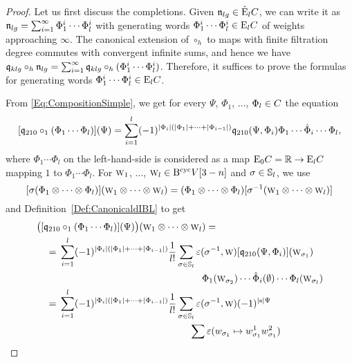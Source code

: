 \documentclass[\MainFolder/Text.tex]{subfiles}
\begin{document}
\begin{proof}
Let us first discuss the completions. Given $\mathfrak{n}_{lg}\in \hat{\mathrm{E}}_l C$, we can write it as $\mathfrak{n}_{lg} = \sum_{i=1}^\infty \Phi_1^i \dotsb \Phi_l^i$ with generating words $\Phi_1^i\dotsb \Phi_l^i\in \mathrm{E}_l C$ of weights approaching $\infty$. The canonical extension of $\circ_h$ to maps with finite filtration degree commutes with convergent infinite sums, and hence we have $\mathfrak{q}_{klg} \circ_h \mathfrak{n}_{lg} = \sum_{i=1}^\infty \mathfrak{q}_{klg}\circ_h (\Phi_1^i \dotsb \Phi_l^i)$. Therefore, it suffices to prove the formulas for generating words $\Phi_1^i \dotsb \Phi_l^i \in \mathrm{E}_l C$.%

From \eqref{Eq:CompositionSimple}, we get for every $\Psi$, $\Phi_1$, $\dotsc$, $\Phi_l \in C$ the equation
$$ [\mathfrak{q}_{210}\circ_1(\Phi_1\dotsb \Phi_l)](\Psi) = \sum_{i=1}^l (-1)^{|\Phi_i|(|\Phi_1|+\dotsb+|\Phi_{i-1}|)}\mathfrak{q}_{210}(\Psi,\Phi_i) \Phi_1 \dotsb \hat{\Phi}_i \dotsb \Phi_l, $$
where $\Phi_1\dotsb \Phi_l$ on the left-hand-side is considered as a map $\mathrm{E}_0 C = \mathbb{R} \rightarrow \mathrm{E}_l C$ mapping $1$ to $\Phi_1\dotsb \Phi_l$.
For $\text{\footnotesize W}_1$, $\dotsc$, $\text{\footnotesize W}_l\in \mathrm{B}^{\mathrm{cyc}} V[3-n]$ and $\sigma\in \mathbb{S}_l$, we use
$$ [\sigma(\Phi_1\otimes \dotsb \otimes \Phi_l)](\text{\footnotesize W}_1 \otimes \dotsb \otimes \text{\footnotesize W}_l) = (\Phi_1 \otimes \dotsb \otimes \Phi_l)[\sigma^{-1}(\text{\footnotesize W}_1\otimes \dotsb \otimes \text{\footnotesize W}_l)] $$
and Definition~\ref{Def:CanonicaldIBL} to get
\allowdisplaybreaks
\begin{align*}
&\bigl([\OPQ_{210}\circ_1(\Phi_1\dotsb \Phi_l)](\Psi)\bigr)(\W_1 \otimes \dotsb \otimes \W_l) = \\
&\quad= \begin{multlined}[t] \sum_{i=1}^l (-1)^{\Abs{\Phi_i}(\Abs{\Phi_1}+\dotsb+\Abs{\Phi_{i-1}})} \frac{1}{l!}\sum_{\sigma\in \Perm_l} \varepsilon(\sigma^{-1},\W) [\OPQ_{210}(\Psi,\Phi_i)](\W_{\sigma_1}) \\ \Phi_1(\W_{\sigma_2}) \dotsb \hat{\Phi}_i(\emptyset) \dotsb \Phi_l(\W_{\sigma_l})\end{multlined} \\
&\quad=\begin{multlined}[t] \sum_{i=1}^l (-1)^{\Abs{\Phi_i}(\Abs{\Phi_1}+\dotsb+\Abs{\Phi_{i-1}})} \frac{1}{l!}\sum_{\sigma\in \Perm_l} \varepsilon(\sigma^{-1},\W) (-1)^{\Abs{\Susp}\Psi}\\ \sum \varepsilon(w_{\sigma_1}\mapsto w_{\sigma_1}^1 w_{\sigma_1}^2) 

\end{multlined}
\end{align*}
\end{proof}
\end{document}
